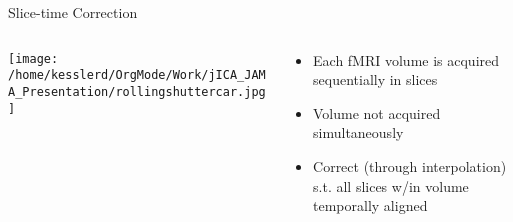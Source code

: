 \documentclass[presentation]{beamer}
\begin{document}
\begin{frame}[label={sec:orgheadline9}]{Slice-time Correction}
\begin{columns}
\begin{column}{.2\columnwidth}
\texttt{[image: /home/kesslerd/OrgMode/Work/jICA\_JAMA\_Presentation/rollingshuttercar.jpg]}
\end{column}
\begin{column}{.5\columnwidth}
\begin{itemize}
\item Each fMRI volume is acquired sequentially in slices
\item Volume not acquired simultaneously
\item Correct (through interpolation) s.t. all slices w/in volume temporally aligned
\end{itemize}
\end{column}
\end{columns}
\end{frame}
\end{document}
